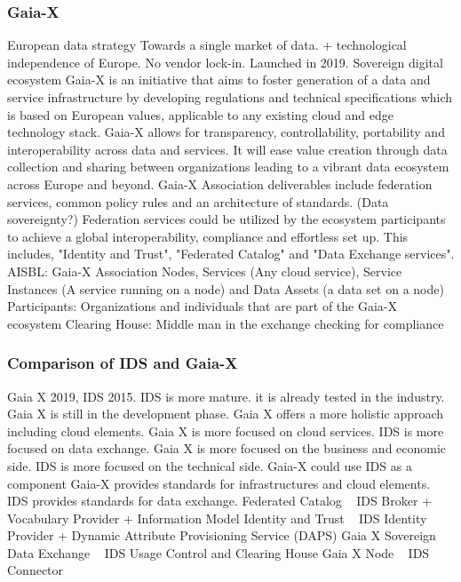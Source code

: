 \documentclass{article}
\begin{document}
\subsubsection*{Gaia-X}
European data strategy Towards a single market of data. + technological independence of Europe. No vendor lock-in. Launched in 2019. Sovereign digital ecosystem
Gaia-X is an initiative that aims to foster generation of a data and service infrastructure by developing regulations and technical specifications which is based on European values, applicable to any existing cloud and edge technology stack. Gaia-X allows for transparency, controllability, portability and interoperability across data and services. It will ease value creation through data collection and sharing between organizations leading to a vibrant data ecosystem across Europe and beyond. Gaia-X Association deliverables include federation services, common policy rules and an architecture of standards. (Data sovereignty?) Federation services could be utilized by the ecosystem participants to achieve a global interoperability, compliance and effortless set up. This includes, "Identity and Trust", "Federated Catalog" and "Data Exchange services". \cite{otto_role_2022}
AISBL: Gaia-X Association
Nodes, Services (Any cloud service), Service Instances (A service running on a node) and Data Assets (a data set on a node)
Participants: Organizations and individuals that are part of the Gaia-X ecosystem
Clearing House: Middle man in the exchange checking for compliance

\subsubsection*{Comparison of IDS and Gaia-X}
Gaia X 2019, IDS 2015. IDS is more mature. it is already tested in the industry. Gaia X is still in the development phase.
Gaia X offers a more holistic approach including cloud elements.
Gaia X is more focused on cloud services. IDS is more focused on data exchange.
Gaia X is more focused on the business and economic side. IDS is more focused on the technical side.
Gaia-X could use IDS as a component \cite{otto_role_2022}
Gaia-X provides standards for infrastructures and cloud elements. IDS provides standards for data exchange.
Federated Catalog ~ IDS Broker + Vocabulary Provider + Information Model
Identity and Trust ~ IDS Identity Provider + Dynamic Attribute Provisioning Service (DAPS)
Gaia X Sovereign Data Exchange ~ IDS Usage Control and Clearing House
Gaia X Node ~ IDS Connector
\end{document}
